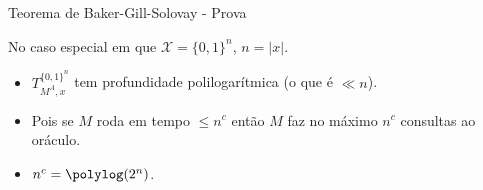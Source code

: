 \documentclass[landscape]{beamer}
\newcommand{\binalph}{\{0, 1\}}
\begin{document}

\begin{frame} {Teorema de Baker-Gill-Solovay - Prova}

No caso especial em que $\mathcal{X} = \binalph^{n}$, $n = \lvert x \rvert$.

\begin{itemize}

	\item $T_{M^{A}, x}^{\binalph^{n}}$ tem profundidade polilogarítmica (o que é $\ll n$).
		
	\item Pois se $M$ roda em tempo $\leq n^{c}$ então $M$ faz no máximo $n^{c}$ consultas ao oráculo.
		
	\item $n^{c} = \polylog(2^{n})$.
		
\end{itemize}

\end{frame}

\end{document}
